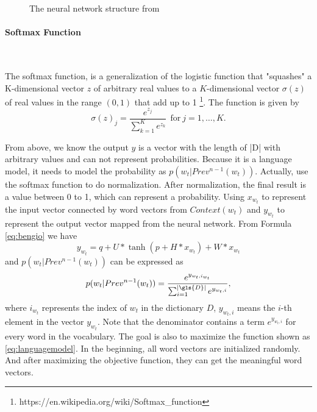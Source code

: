 \begin{figure}[!ht]
  \centering
	\caption{The neural network structure from \citep{BengioDucharmeEtAl2003}}
	\label{fig:bengio}
\end{figure}

\paragraph{Softmax Function}\ 

The softmax function, is a generalization of the logistic function that "squashes" a K-dimensional vector $z$ of arbitrary real values to a $K$-dimensional vector $\sigma(z)$ of real values in the range $(0,1)$ that add up to 1 \footnote{https://en.wikipedia.org/wiki/Softmax\_function}. The function is given by
$$\sigma(z)_j=\frac{e^{z_j}}{\sum^K_{k=1}e^{z_k}} \ \ \mathrm{for}\ j=1,\ldots,K.$$

From above, we know the output $y$ is a vector with the length of |\gls{D}| with arbitrary values and can not represent probabilities. Because it is a language model, it needs to model the probability as $p(w_t|Prev^{n-1}(w_t))$. Actually, \cite{BengioDucharmeEtAl2003} use the softmax function to do normalization. After normalization, the final result is a value between 0 to 1, which can represent a probability. Using $x_{w_t}$ to represent the input vector connected by word vectors from $Context(w_t)$ and $y_{w_t}$ to represent the output vector mapped from the neural network. From Formula \ref{eq:bengio} we have
\begin{equation}
y_{w_t}=q+U*\tanh(p+H*x_{w_t}) + W*x_{w_t}
\end{equation}
and $p(w_t|Prev^{n-1}(w_t))$ can be expressed as 
\begin{equation}\label{eq:softmax}
p(w_t|Prev^{n-1}(w_t))=\frac{e^{y_{w_t,i_{w_t}}}}{\sum^{|\gls{D}|}_{i=1}e^{y_{w_t,i}}},
\end{equation}
where $i_{w_t}$ represents the index of $w_t$ in the dictionary $D$, $y_{w_t,i}$ means the $i$-th element in the vector $y_{w_t}$. Note that the denominator contains a term $e^{y_{{w_t},i}}$ for every word in the vocabulary.
The goal is also to maximize the function shown as \ref{eq:languagemodel}. In the beginning, all word vectors are initialized randomly. And after maximizing the objective function, they can get the meaningful word vectors.

